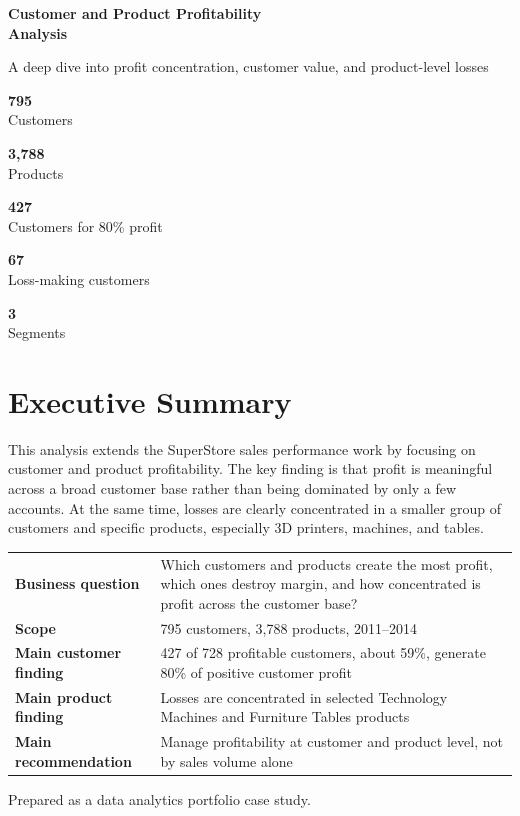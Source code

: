 \documentclass[11pt,a4paper]{article}
\newcommand{\metric}[2]{
    \begin{minipage}[t]{0.18\textwidth}
        \colorbox{panel}{
            \begin{minipage}[t][25mm][c]{0.92\linewidth}
                \centering
                {\Large\bfseries\color{ink} #1}\\[2mm]
                {\small\color{muted} #2}
            \end{minipage}
        }
    \end{minipage}
}
\begin{document}
\begin{titlepage}
    \thispagestyle{fancy}
    \vspace*{8mm}
    {\Huge\bfseries\color{ink} Customer and Product Profitability\\[2mm]Analysis\par}
    \vspace{3mm}
    {\Large\color{muted} A deep dive into profit concentration, customer value, and product-level losses\par}
    \vspace{12mm}

    \metric{795}{Customers}
    \hfill
    \metric{3,788}{Products}
    \hfill
    \metric{427}{Customers for 80\% profit}
    \hfill
    \metric{67}{Loss-making customers}
    \hfill
    \metric{3}{Segments}

    \vspace{14mm}
    \section*{Executive Summary}
    This analysis extends the SuperStore sales performance work by focusing on customer and product profitability.
    The key finding is that profit is meaningful across a broad customer base rather than being dominated by only a few accounts.
    At the same time, losses are clearly concentrated in a smaller group of customers and specific products, especially 3D printers, machines, and tables.

    \vspace{4mm}
    \begin{tabularx}{\textwidth}{>{\bfseries}p{45mm}X}
        \toprule
        Business question & Which customers and products create the most profit, which ones destroy margin, and how concentrated is profit across the customer base? \\
        Scope & 795 customers, 3,788 products, 2011--2014 \\
        Main customer finding & 427 of 728 profitable customers, about 59\%, generate 80\% of positive customer profit \\
        Main product finding & Losses are concentrated in selected Technology Machines and Furniture Tables products \\
        Main recommendation & Manage profitability at customer and product level, not by sales volume alone \\
        \bottomrule
    \end{tabularx}

    \vfill
    {\color{muted} Prepared as a data analytics portfolio case study.}
\end{titlepage}
\setcounter{page}{2}
\end{document}
